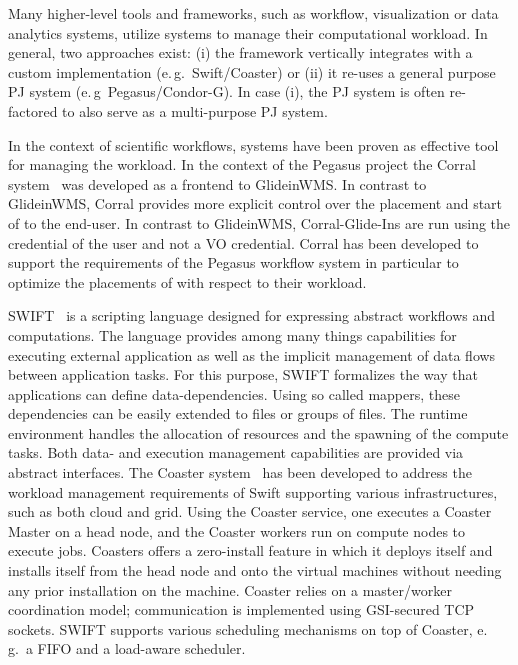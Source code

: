 \documentclass{sig-alternate}
\begin{document}
Many higher-level tools and frameworks, such as workflow,
visualization or data analytics systems, utilize \pilotjob systems to
manage their computational workload. In general, two approaches exist:
(i) the framework vertically integrates with a custom \pilotjob
implementation (e.\,g.\ Swift/Coaster) or (ii) it re-uses a general
purpose PJ system (e.\,g\ Pegasus/Condor-G). In case (i), the PJ
system is often re-factored to also serve as a multi-purpose PJ
system. 

In the context of scientific workflows, \pilotjob systems have been
proven as effective tool for managing the workload. In the context of
the Pegasus project the Corral
system~\cite{Rynge:2011:EUG:2116259.2116599} was developed as a
frontend to GlideinWMS. In contrast to GlideinWMS, Corral provides
more explicit control over the placement and start of \pilots to the
end-user. In contrast to GlideinWMS, Corral-Glide-Ins are run using
the credential of the user and not a VO credential. Corral has been
developed to support the requirements of the Pegasus workflow system
in particular to optimize the placements of \pilots with respect to
their workload.

SWIFT~\cite{Wilde2011} is a scripting language designed for expressing
abstract workflows and computations. The language provides among many
things capabilities for executing external application as well as the
implicit management of data flows between application tasks. For this
purpose, SWIFT formalizes the way that applications can define
data-dependencies. Using so called mappers, these dependencies can be
easily extended to files or groups of files. The runtime environment
handles the allocation of resources and the spawning of the compute
tasks. Both data- and execution management capabilities are provided
via abstract interfaces. The Coaster system~\cite{coasters} has been
developed to address the workload management requirements of Swift
supporting various infrastructures, such as both cloud and grid. Using
the Coaster service, one executes a Coaster Master on a head node, and
the Coaster workers run on compute nodes to execute jobs.  Coasters
offers a zero-install feature in which it deploys itself and installs
itself from the head node and onto the virtual machines without
needing any prior installation on the machine. Coaster relies on a
master/worker coordination model; communication is implemented using
GSI-secured TCP sockets. SWIFT supports various scheduling mechanisms
on top of Coaster, e.\,g.\ a FIFO and a load-aware scheduler.
\end{document}
